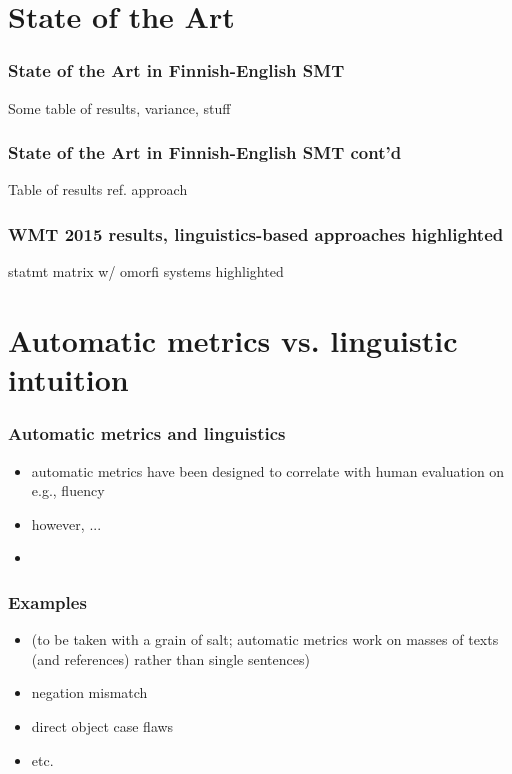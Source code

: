\documentclass{beamer}
\begin{document}
\section{State of the Art}

\begin{frame}
    \frametitle{State of the Art in Finnish-English SMT}
    Some table of results, variance, stuff
\end{frame}

\begin{frame}
    \frametitle{State of the Art in Finnish-English SMT cont'd}
    Table of results ref. approach
\end{frame}

\begin{frame}
    \frametitle{WMT 2015 results, linguistics-based approaches highlighted}
    statmt matrix w/ omorfi systems highlighted
\end{frame}

\section{Automatic metrics vs. linguistic intuition}

\begin{frame}
    \frametitle{Automatic metrics and linguistics}
    \begin{itemize}
        \item automatic metrics have been designed to correlate with human
            evaluation on e.g., fluency
        \item however, ...
        \item
    \end{itemize}
\end{frame}

\begin{frame}
    \frametitle{Examples}
    \begin{itemize}
        \item (to be taken with a grain of salt; automatic metrics work on
            masses of texts (and references) rather than single sentences)
        \item negation mismatch
        \item direct object case flaws
        \item etc.
    \end{itemize}
\end{frame}
\end{document}
